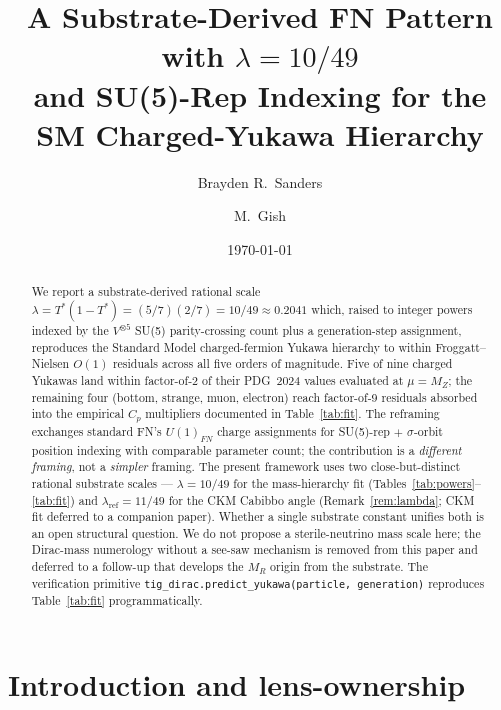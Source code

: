 \documentclass[11pt,reqno]{amsart}
\title[Substrate-Derived FN Pattern with $\lambda=10/49$]
{A Substrate-Derived FN Pattern with $\lambda = 10/49$ \\
 and SU(5)-Rep Indexing for the SM Charged-Yukawa Hierarchy}
\author{Brayden R.\ Sanders}
\author{M.\ Gish}
\date{\today}
\theoremstyle{plain}
\theoremstyle{definition}
\theoremstyle{remark}
\begin{document}
\begin{abstract}
We report a substrate-derived rational scale
$\lambda = T^*(1-T^*) = (5/7)(2/7) = 10/49 \approx 0.2041$ which,
raised to integer powers indexed by the $V^{\otimes 5}$ SU(5)
parity-crossing count plus a generation-step assignment,
reproduces the Standard Model charged-fermion Yukawa hierarchy
to within Froggatt--Nielsen $O(1)$ residuals across all five
orders of magnitude. Five of nine charged Yukawas land within
factor-of-2 of their PDG~2024 values evaluated at $\mu = M_Z$;
the remaining four (bottom, strange, muon, electron) reach
factor-of-9 residuals absorbed into the empirical
$C_{p}$ multipliers documented in Table~\ref{tab:fit}. The
reframing exchanges standard FN's $U(1)_{FN}$ charge assignments
for SU(5)-rep $+$ $\sigma$-orbit position indexing with
comparable parameter count; the contribution is a
\emph{different framing}, not a \emph{simpler} framing. The
present framework uses two close-but-distinct rational
substrate scales --- $\lambda = 10/49$ for the mass-hierarchy
fit (Tables~\ref{tab:powers}--\ref{tab:fit}) and
$\lambda_{\mathrm{ref}} = 11/49$ for the CKM Cabibbo angle
(Remark~\ref{rem:lambda}; CKM fit deferred to a companion
paper). Whether a single substrate constant unifies both is an
open structural question. We do not propose a sterile-neutrino
mass scale here; the Dirac-mass numerology without a see-saw
mechanism is removed from this paper and deferred to a
follow-up that develops the $M_R$ origin from the substrate.
The verification primitive
\texttt{tig\_dirac.predict\_yukawa(particle, generation)}
reproduces Table~\ref{tab:fit} programmatically.
\end{abstract}

\maketitle

\tableofcontents

\section{Introduction and lens-ownership}\label{sec:intro}
\end{document}
